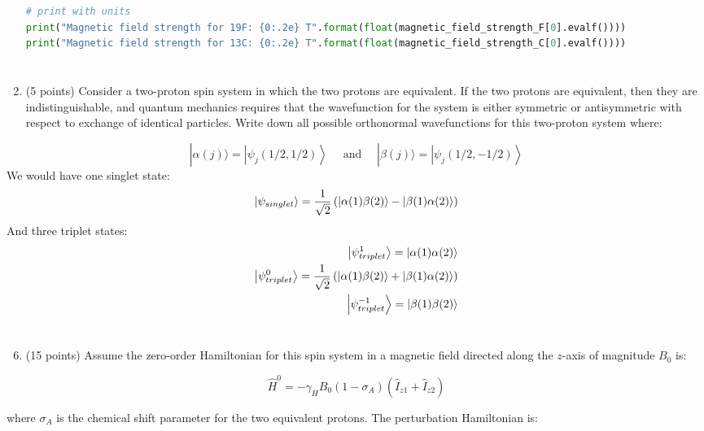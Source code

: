 \documentclass[12pt]{article}
\begin{document}
\begin{enumerate}
\begin{lstlisting}[language=Python]
# print with units
print("Magnetic field strength for 19F: {0:.2e} T".format(float(magnetic_field_strength_F[0].evalf())))
print("Magnetic field strength for 13C: {0:.2e} T".format(float(magnetic_field_strength_C[0].evalf())))

\end{lstlisting}
\section{}
  \item (5 points) Consider a two-proton spin system in which the two protons are equivalent. If the two protons are equivalent, then they are indistinguishable, and quantum mechanics requires that the wavefunction for the system is either symmetric or antisymmetric with respect to exchange of identical particles. Write down all possible orthonormal wavefunctions for this two-proton system where:

\end{enumerate}

$$
|\alpha(j)\rangle=\left|\psi_{j}(1 / 2,1 / 2)\right\rangle \quad \text { and } \quad|\beta(j)\rangle=\left|\psi_{j}(1 / 2,-1 / 2)\right\rangle
$$
We would have one singlet state:
\begin{equation}
  \ket{\psi_{singlet}} = \frac{1}{\sqrt{2}} \left( \ket{\alpha(1)\beta(2)} - \ket{\beta(1)\alpha(2)} \right)
\end{equation}
And three triplet states:
\begin{align}
  \ket{\psi_{triplet}^{1}} = \ket{\alpha(1)\alpha(2)}\\
  \ket{\psi_{triplet}^{0}} = \frac{1}{\sqrt{2}} \left( \ket{\alpha(1)\beta(2)} + \ket{\beta(1)\alpha(2)} \right)\\
  \ket{\psi_{triplet}^{-1}} = \ket{\beta(1)\beta(2)}
\end{align}
\section{}
\begin{enumerate}
  \setcounter{enumi}{5}
  \item (15 points) Assume the zero-order Hamiltonian for this spin system in a magnetic field directed along the $z$-axis of magnitude $B_{0}$ is:
\end{enumerate}

$$
\widehat{H}^{0}=-\gamma_{H} B_{0}\left(1-\sigma_{A}\right)\left(\hat{I}_{z 1}+\hat{I}_{z 2}\right)
$$

where $\sigma_{A}$ is the chemical shift parameter for the two equivalent protons. The perturbation Hamiltonian is:
\end{document}
